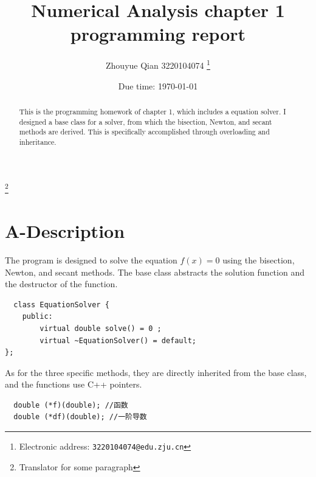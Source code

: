 \documentclass[a4paper]{article}
\begin{document}
\title{Numerical Analysis chapter 1 programming report}

\author{Zhouyue Qian 3220104074
  \thanks{Electronic address: \texttt{3220104074@edu.zju.cn}}}
  \thanks{Translator for some paragraph\cite{kimiassistant}}


\date{Due time: \today}

\maketitle

\begin{abstract}
   This is the programming homework of chapter 1, which includes a equation solver. 
   I designed a base class for a solver, from which the bisection, Newton, and secant methods are derived. 
   This is specifically accomplished through overloading and inheritance.
\end{abstract}

\section*{A-Description}
The program is designed to solve the equation $f(x)=0$ using the bisection, Newton, and secant methods.
The base class abstracts the solution function and the destructor of the function.

\begin{lstlisting}
  class EquationSolver {
    public:
        virtual double solve() = 0 ;
        virtual ~EquationSolver() = default;
};
\end{lstlisting}
As for the three specific methods, they are directly inherited from the base class, and the functions use C++ pointers.\cite{deepseek}
\begin{lstlisting}
  double (*f)(double); //函数
  double (*df)(double); //一阶导数
\end{lstlisting}
\end{document}
